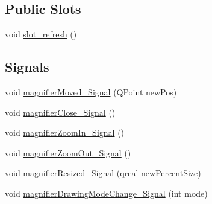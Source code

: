 \subsection*{Public Slots}
\begin{DoxyCompactItemize}
\item 
void \hyperlink{class_u_b_magnifier_a7497d3351ddbded1b3904d2700517f9a}{slot\-\_\-refresh} ()
\end{DoxyCompactItemize}
\subsection*{Signals}
\begin{DoxyCompactItemize}
\item 
void \hyperlink{class_u_b_magnifier_ab42d374d1f9d60121a60400e454cc4b8}{magnifier\-Moved\-\_\-\-Signal} (Q\-Point new\-Pos)
\item 
void \hyperlink{class_u_b_magnifier_a7abd5e3372abef73daccbadf05978a61}{magnifier\-Close\-\_\-\-Signal} ()
\item 
void \hyperlink{class_u_b_magnifier_abc083dbf3fd42d44d755a806e453430e}{magnifier\-Zoom\-In\-\_\-\-Signal} ()
\item 
void \hyperlink{class_u_b_magnifier_a4a4800176cdcc5ffafcc18cc9fe2c2da}{magnifier\-Zoom\-Out\-\_\-\-Signal} ()
\item 
void \hyperlink{class_u_b_magnifier_ac1130b201672dbead4d784ebee3c1a78}{magnifier\-Resized\-\_\-\-Signal} (qreal new\-Percent\-Size)
\item 
void \hyperlink{class_u_b_magnifier_a50476e36be6931a2ae3786daaa2273a5}{magnifier\-Drawing\-Mode\-Change\-\_\-\-Signal} (int mode)
\end{DoxyCompactItemize}
